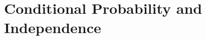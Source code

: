 \chapterspaceabove{6.75cm} 
\chapterspacebelow{7.25cm} 
\chapter{Conditional Probability and Independence}